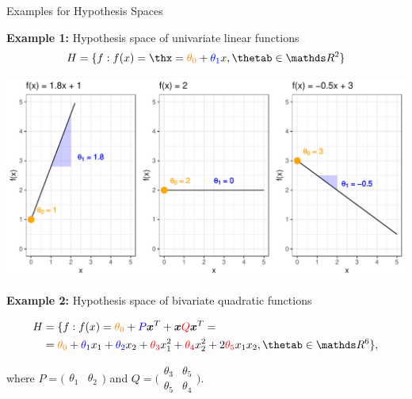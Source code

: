 \documentclass[11pt,compress,t,notes=noshow, xcolor=table]{beamer}
\begin{document}

\begin{vbframe}{Examples for Hypothesis Spaces}

\textbf{Example 1:} Hypothesis space of univariate linear functions
$$\Hspace = \{f: \fx = \thx =  \textcolor{orange}{\theta_0} + 
\textcolor{blue}{\theta_1} x, \thetab \in \R^2\}$$

\begin{center}
  \includegraphics[width = \textwidth]{figure/hs-lin-functions.pdf}
\end{center}

\framebreak

\textbf{Example 2:} Hypothesis space of bivariate quadratic functions

\begin{equation*}
  \begin{split}
    \Hspace &= \{f: \fx =  \textcolor{orange}{\theta_0} + \textcolor{blue}{P} 
    \xv^T + \xv \textcolor{red}{Q} \xv^T =  \\
    &= \textcolor{orange}{\theta_0} + \textcolor{blue}{\theta_1} x_1 + 
    \textcolor{blue}{\theta_2} x_2 + \textcolor{red}{\theta_3} x_1^2 + 
    \textcolor{red}{\theta_4} x_2^2 + 2 \textcolor{red}{\theta_5} x_1 x_2, 
    \thetab \in \R^6\},
  \end{split}
\end{equation*}

where 
$P = \big(\begin{smallmatrix}
\theta_1 & \theta_2
\end{smallmatrix}\big)$
and
$Q = \big(\begin{smallmatrix}
\theta_3 & \theta_5 \\
\theta_5 & \theta_4
\end{smallmatrix}\big).$


\end{vbframe}
\end{document}
